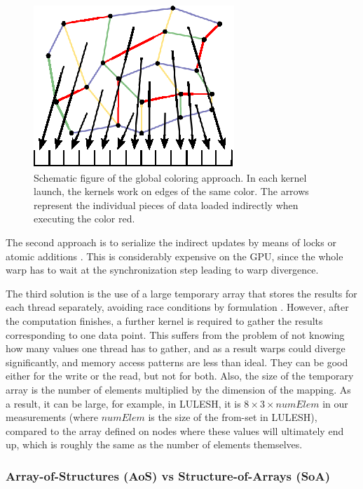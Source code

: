 \begin{figure}[Htpb]
  \centering
  \includegraphics{fig/svg/unstructured_global.eps}
  \caption{Schematic figure of the global coloring approach. In each kernel
  launch, the kernels work on edges of the same color. The arrows
  represent the individual pieces of data loaded indirectly when executing the 
color red.}
  \label{fig:unstructured_global}
\end{figure}

The second approach is to serialize the indirect updates by means of locks or
atomic additions \cite{Kraus:2014:ACC:2691158.2691164}. This is considerably 
expensive on the GPU, since the whole warp has to wait at the synchronization 
step leading to warp divergence.

The third solution is the use of a large temporary array that stores the
results for each thread separately, avoiding race conditions by formulation 
\cite{LULESH:spec,miniaero}. However, after the computation finishes, a 
further kernel is required to gather the results corresponding to one data 
point. This suffers from the problem of not knowing how many values one thread 
has to gather, and as a result warps could diverge significantly, and 
memory access patterns are less than ideal. They can be good either for the 
write or the read, but not for both. Also, the size of the temporary array is the 
number of elements multiplied by the dimension of the mapping. As a result, it 
can be large, for example, in LULESH, it is \(8 \times 3 \times numElem \) 
in our measurements (where $numElem$ is the size of the from-set in LULESH), 
compared to the array defined on nodes where these values will ultimately end 
up, which is roughly the same as the number of elements themselves.

\subsubsection{Array-of-Structures (AoS) vs Structure-of-Arrays (SoA)} 
\label{aos-to-soa}

